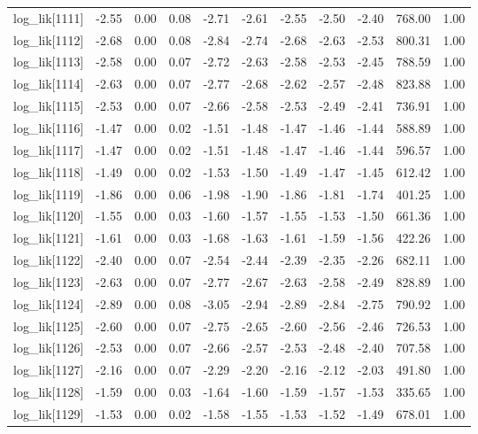 \begin{table}[ht]
\begin{tabular}{rrrrrrrrrrr}
  log\_lik[1111] & -2.55 & 0.00 & 0.08 & -2.71 & -2.61 & -2.55 & -2.50 & -2.40 & 768.00 & 1.00 \\ 
  log\_lik[1112] & -2.68 & 0.00 & 0.08 & -2.84 & -2.74 & -2.68 & -2.63 & -2.53 & 800.31 & 1.00 \\ 
  log\_lik[1113] & -2.58 & 0.00 & 0.07 & -2.72 & -2.63 & -2.58 & -2.53 & -2.45 & 788.59 & 1.00 \\ 
  log\_lik[1114] & -2.63 & 0.00 & 0.07 & -2.77 & -2.68 & -2.62 & -2.57 & -2.48 & 823.88 & 1.00 \\ 
  log\_lik[1115] & -2.53 & 0.00 & 0.07 & -2.66 & -2.58 & -2.53 & -2.49 & -2.41 & 736.91 & 1.00 \\ 
  log\_lik[1116] & -1.47 & 0.00 & 0.02 & -1.51 & -1.48 & -1.47 & -1.46 & -1.44 & 588.89 & 1.00 \\ 
  log\_lik[1117] & -1.47 & 0.00 & 0.02 & -1.51 & -1.48 & -1.47 & -1.46 & -1.44 & 596.57 & 1.00 \\ 
  log\_lik[1118] & -1.49 & 0.00 & 0.02 & -1.53 & -1.50 & -1.49 & -1.47 & -1.45 & 612.42 & 1.00 \\ 
  log\_lik[1119] & -1.86 & 0.00 & 0.06 & -1.98 & -1.90 & -1.86 & -1.81 & -1.74 & 401.25 & 1.00 \\ 
  log\_lik[1120] & -1.55 & 0.00 & 0.03 & -1.60 & -1.57 & -1.55 & -1.53 & -1.50 & 661.36 & 1.00 \\ 
  log\_lik[1121] & -1.61 & 0.00 & 0.03 & -1.68 & -1.63 & -1.61 & -1.59 & -1.56 & 422.26 & 1.00 \\ 
  log\_lik[1122] & -2.40 & 0.00 & 0.07 & -2.54 & -2.44 & -2.39 & -2.35 & -2.26 & 682.11 & 1.00 \\ 
  log\_lik[1123] & -2.63 & 0.00 & 0.07 & -2.77 & -2.67 & -2.63 & -2.58 & -2.49 & 828.89 & 1.00 \\ 
  log\_lik[1124] & -2.89 & 0.00 & 0.08 & -3.05 & -2.94 & -2.89 & -2.84 & -2.75 & 790.92 & 1.00 \\ 
  log\_lik[1125] & -2.60 & 0.00 & 0.07 & -2.75 & -2.65 & -2.60 & -2.56 & -2.46 & 726.53 & 1.00 \\ 
  log\_lik[1126] & -2.53 & 0.00 & 0.07 & -2.66 & -2.57 & -2.53 & -2.48 & -2.40 & 707.58 & 1.00 \\ 
  log\_lik[1127] & -2.16 & 0.00 & 0.07 & -2.29 & -2.20 & -2.16 & -2.12 & -2.03 & 491.80 & 1.00 \\ 
  log\_lik[1128] & -1.59 & 0.00 & 0.03 & -1.64 & -1.60 & -1.59 & -1.57 & -1.53 & 335.65 & 1.00 \\ 
  log\_lik[1129] & -1.53 & 0.00 & 0.02 & -1.58 & -1.55 & -1.53 & -1.52 & -1.49 & 678.01 & 1.00 \\ 

\end{tabular}
\end{table}
